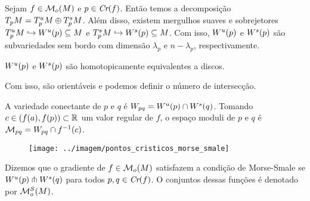 \documentclass{beamer}
\begin{document}
	\begin{frame}
		
		\begin{teorema}
			Sejam $f \in \mathcal{M}_{o}(M)$ e $p \in \textit{Cr}(f)$. Então temos a decomposição $T_{p}M=T^{u}_{p}M\oplus T^{s}_{p}M$. Além disso, existem mergulhos suaves e sobrejetores $T^{u}_{p}M \hookrightarrow W^{u}(p) \subseteq M$ e $T^{s}_{p}M \hookrightarrow W^{s}(p) \subseteq M$. Com isso, $W^{u}(p)$ e $W^{s}(p)$ são subvariedades sem bordo com dimensão $\lambda_{p}$ e $n-\lambda_{p}$, respectivamente.
		\end{teorema}
	
		\begin{observacao}
			$W^{u}(p)$ e $W^{s}(p)$ são homotopicamente equivalentes a discos.
		\end{observacao}
		
		\begin{tiny}
			Com isso, são orientáveis e podemos definir o número de intersecção.
		\end{tiny}
	\end{frame}
	
	\begin{frame}
		
		\begin{definicao}
			A variedade conectante de $p$ e $q$ é $W_{pq} = W^{u}(p)\cap W^{s}(q)$. Tomando $c \in (f(a), f(p)) \subset \mathbb{R}^{}$ um valor regular de $f$, o espaço moduli de $p$ e $q$ é $\mathcal{M}_{pq} = W_{pq}\cap f^{-1}(c)$.
		\end{definicao}
		
		\begin{figure}
			\centering
			\textbf{}\par
			\texttt{[image: ../imagem/pontos\_cristicos\_morse\_smale]}
		\end{figure}
		
		\begin{definicao}
			Dizemos que o gradiente de $f \in \mathcal{M}_{o}(M)$ satisfazem a condição de Morse-Smale se $W^{u}(p)\pitchfork W^{s}(q)$ para todos $p,q \in \textit{Cr}(f)$. O conjuntos dessas funções é denotado por $\mathcal{M}^{S}_{o}(M)$.
		\end{definicao}
	
	\end{frame}
	
\end{document}
